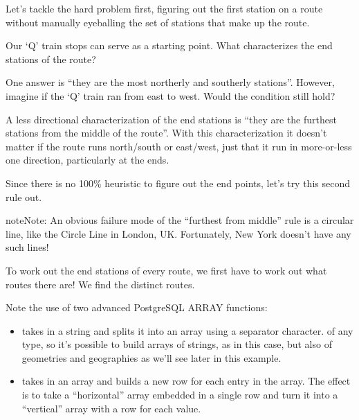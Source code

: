 \documentclass[a4paper,11pt,english]{sphinxmanual}
\let\sphinxpxdimen\pdfpxdimen\else\newdimen\sphinxpxdimen
\begin{document}
Let’s tackle the hard problem first, figuring out the first station on a route without manually eyeballing the set of stations that make up the route.

Our ‘Q’ train stops can serve as a starting point. What characterizes the end stations of the route?

\noindent\sphinxincludegraphics[height=700\sphinxpxdimen]{{adv_geom01}.png}

One answer is “they are the most northerly and southerly stations”. However, imagine if the ‘Q’ train ran from east to west. Would the condition still hold?

A less directional characterization of the end stations is “they are the furthest stations from the middle of the route”. With this characterization it doesn’t matter if the route runs north/south or east/west, just that it run in more-or-less one direction, particularly at the ends.

Since there is no 100\% heuristic to figure out the end points, let’s try this second rule out.

\begin{sphinxadmonition}{note}{Note:}
An obvious failure mode of the “furthest from middle” rule is a circular line, like the Circle Line in London, UK. Fortunately, New York doesn’t have any such lines!
\end{sphinxadmonition}

To work out the end stations of every route, we first have to work out what routes there are! We find the distinct routes.

\begin{sphinxVerbatim}[commandchars=\\\{\}]
   
      
      
   
\end{sphinxVerbatim}

Note the use of two advanced PostgreSQL ARRAY functions:
\begin{itemize}
\item {} 
 takes in a string and splits it into an array using a separator character.  of any type, so it’s possible to build arrays of strings, as in this case, but also of geometries and geographies as we’ll see later in this example.

\item {} 
 takes in an array and builds a new row for each entry in the array. The effect is to take a “horizontal” array embedded in a single row and turn it into a “vertical” array with a row for each value.

\end{itemize}
\end{document}
